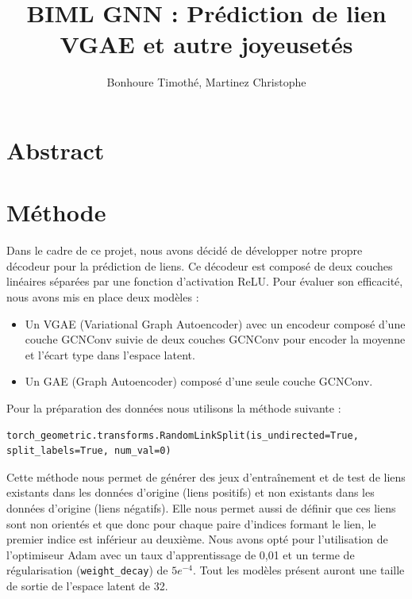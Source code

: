 \documentclass{article}
\begin{document}
\renewcommand{\arraystretch}{1.5}

\title{BIML GNN : Prédiction de lien \\
\footnotesize{VGAE et autre joyeusetés}}
\author{Bonhoure Timothé, Martinez Christophe}                      %

\maketitle
\tableofcontents
\section*{Abstract}
\newpage

\section{Méthode}

Dans le cadre de ce projet, nous avons décidé de développer notre propre décodeur pour la prédiction de liens. Ce décodeur est composé de deux couches linéaires séparées par une fonction d'activation ReLU. Pour évaluer son efficacité, nous avons mis en place deux modèles :
\begin{itemize}
    \item Un VGAE (Variational Graph Autoencoder) avec un encodeur composé d'une couche GCNConv suivie de deux couches GCNConv pour encoder la moyenne et l'écart type dans l'espace latent.
    \item Un GAE (Graph Autoencoder) composé d'une seule couche GCNConv.
\end{itemize}
Pour la préparation des données nous utilisons la méthode suivante :
\begin{verbatim}
torch_geometric.transforms.RandomLinkSplit(is_undirected=True, split_labels=True, num_val=0)
\end{verbatim}
Cette méthode nous permet de générer des jeux d’entraînement et de test de liens existants dans les données d'origine (liens positifs) et non existants dans les données d'origine (liens négatifs). Elle nous permet aussi de définir que ces liens sont non orientés et que donc pour chaque paire d’indices formant le lien, le premier indice est inférieur au deuxième.
Nous avons opté pour l'utilisation de l'optimiseur Adam avec un taux d'apprentissage de 0,01 et un terme de régularisation (\texttt{weight\_decay}) de \(5e^{-4}\).
Tout les modèles présent auront une taille de sortie de l'espace latent de 32.
\end{document}
